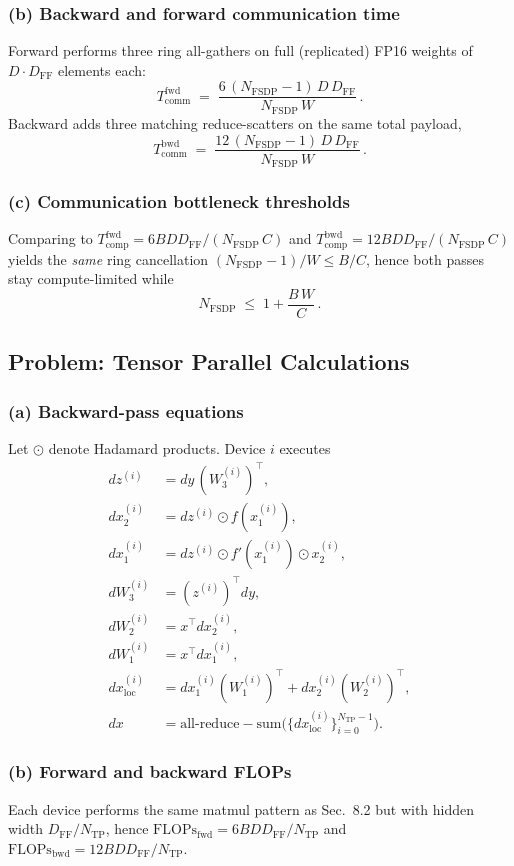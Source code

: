\documentclass[11pt]{article}
\newcommand{\question}[1]{\subsection*{#1}}
\newcommand{\subquestion}[1]{\subsubsection*{#1}}
\begin{document}
\subquestion{(b) Backward and forward communication time}
Forward performs three ring all-gathers on full (replicated) FP16 weights of $D\cdot D_{\mathrm{FF}}$ elements each:
\[
  T_{\mathrm{comm}}^{\mathrm{fwd}} \;=\; \frac{6\,(N_{\mathrm{FSDP}}-1)\,D\,D_{\mathrm{FF}}}{N_{\mathrm{FSDP}}\,W}\,.
\]
Backward adds three matching reduce-scatters on the same total payload,
\[
  T_{\mathrm{comm}}^{\mathrm{bwd}} \;=\; \frac{12\,(N_{\mathrm{FSDP}}-1)\,D\,D_{\mathrm{FF}}}{N_{\mathrm{FSDP}}\,W}\,.
\]
\subquestion{(c) Communication bottleneck thresholds}
Comparing to $T_{\mathrm{comp}}^{\mathrm{fwd}} = 6 B D D_{\mathrm{FF}}/(N_{\mathrm{FSDP}}\,C)$ and $T_{\mathrm{comp}}^{\mathrm{bwd}} = 12 B D D_{\mathrm{FF}}/(N_{\mathrm{FSDP}}\,C)$ yields the \emph{same} ring cancellation $(N_{\mathrm{FSDP}}-1)/W \le B/C$, hence both passes stay compute-limited while
\[
  N_{\mathrm{FSDP}} \;\le\; 1 + \frac{B\,W}{C}\,.
\]

\question{Problem: Tensor Parallel Calculations}
\subquestion{(a) Backward-pass equations}
Let $\odot$ denote Hadamard products. Device $i$ executes
\begin{align*}
  d z^{(i)} &= d y\,(W_{3}^{(i)})^{\top},\\
  d x_{2}^{(i)} &= d z^{(i)} \odot f(x_{1}^{(i)}),\\
  d x_{1}^{(i)} &= d z^{(i)} \odot f'(x_{1}^{(i)}) \odot x_{2}^{(i)},\\
  d W_{3}^{(i)} &= (z^{(i)})^{\top} d y,\\
  d W_{2}^{(i)} &= x^{\top} d x_{2}^{(i)},\\
  d W_{1}^{(i)} &= x^{\top} d x_{1}^{(i)},\\
  d x_{\mathrm{loc}}^{(i)} &= d x_{1}^{(i)} (W_{1}^{(i)})^{\top} + d x_{2}^{(i)} (W_{2}^{(i)})^{\top},\\
  d x &= \mathrm{all\text{-}reduce-sum}\bigl(\{d x_{\mathrm{loc}}^{(i)}\}_{i=0}^{N_{\mathrm{TP}}-1}\bigr).
\end{align*}

\subquestion{(b) Forward and backward FLOPs}
Each device performs the same matmul pattern as Sec.~8.2 but with hidden width $D_{\mathrm{FF}}/N_{\mathrm{TP}}$, hence $\displaystyle \mathrm{FLOPs}_{\mathrm{fwd}} = 6 B D D_{\mathrm{FF}}/N_{\mathrm{TP}}$ and $\displaystyle \mathrm{FLOPs}_{\mathrm{bwd}} = 12 B D D_{\mathrm{FF}}/N_{\mathrm{TP}}$.
\end{document}

